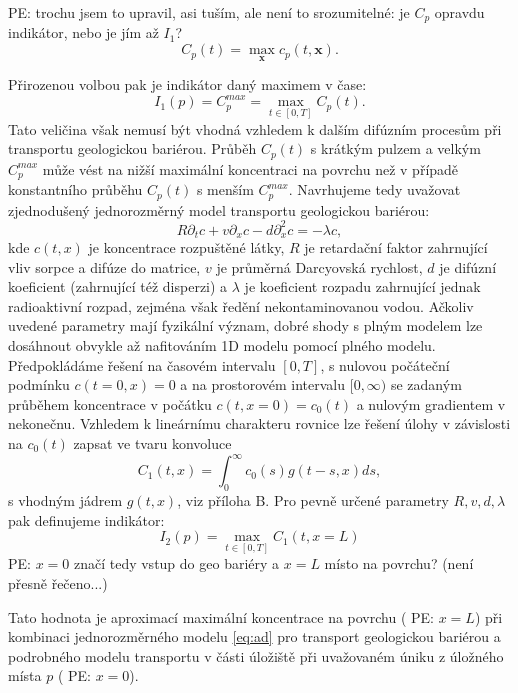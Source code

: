 \documentclass{article}
\def\vc#1{\mathbf{\boldsymbol{#1}}}     %
\newcommand{\pe}[1]{{\color{orange} PE: #1}}
\begin{document}
\pe{trochu jsem to upravil, asi tuším, ale není to srozumitelné: je $C_p$ opravdu indikátor, nebo je jím až $I_1$?}
\[
  C_p(t) = \max_{\vc x} c_p(t, \vc x).
\]

Přirozenou volbou pak je indikátor daný maximem v čase:
\begin{equation}
    I_1(p) = C_p^{max} = \max_{t\in[0, T]} C_p(t).
\end{equation}
Tato veličina však nemusí být vhodná vzhledem k dalším difúzním procesům při transportu geologickou bariérou.
Průběh $C_p(t)$ s krátkým pulzem a velkým $C_p^{max}$ může vést na nižší maximální koncentraci na povrchu než v případě konstantního průběhu $C_p(t)$ s menším  $C_p^{max}$. Navrhujeme tedy uvažovat zjednodušený jednorozměrný model transportu geologickou bariérou:
\begin{equation}
    \label{eq:ad}
    R\partial_t c + v \partial_x c - d \partial^2_x c = - \lambda c,
\end{equation}
kde $c(t,x)$ je koncentrace rozpuštěné látky, $R$ je retardační faktor zahrnující vliv sorpce a difúze do matrice, $v$ je průměrná Darcyovská rychlost, $d$ je difúzní koeficient (zahrnující též disperzi) a $\lambda$ je koeficient rozpadu zahrnující jednak radioaktivní rozpad, zejména však ředění nekontaminovanou vodou. Ačkoliv uvedené parametry mají fyzikální význam, dobré shody s plným modelem lze dosáhnout obvykle až nafitováním 1D modelu pomocí plného modelu.
Předpokládáme řešení na časovém intervalu  $[0, T]$, s nulovou počáteční podmínku $c(t=0, x) = 0$ a na prostorovém intervalu $[0, \infty)$ se zadaným 
průběhem koncentrace v počátku $c(t, x=0) = c_0(t)$ a nulovým gradientem v nekonečnu.
Vzhledem k lineárnímu charakteru rovnice lze řešení úlohy v závislosti na $c_0(t)$ zapsat ve tvaru konvoluce
\begin{equation}
    C_1(t, x) = \int_{0}^\infty c_0(s) g(t - s, x) ds,
\end{equation}
s  vhodným jádrem $g(t, x)$, viz příloha B. Pro pevně určené parametry $R, v, d, \lambda$ pak definujeme indikátor:
\begin{equation}
    I_2(p) =  \max_{t\in[0, T]} C_1(t, x=L)
\end{equation}
\pe{$x=0$ značí tedy vstup do geo bariéry a $x=L$  místo na povrchu? (není přesně řečeno...)}

Tato hodnota je aproximací maximální koncentrace na povrchu (\pe{$x=L$})
při kombinaci jednorozměrného modelu \eqref{eq:ad} pro transport geologickou bariérou a podrobného modelu transportu v části úložiště při uvažovaném úniku z úložného místa $p$ (\pe{$x=0$}). 
\end{document}
